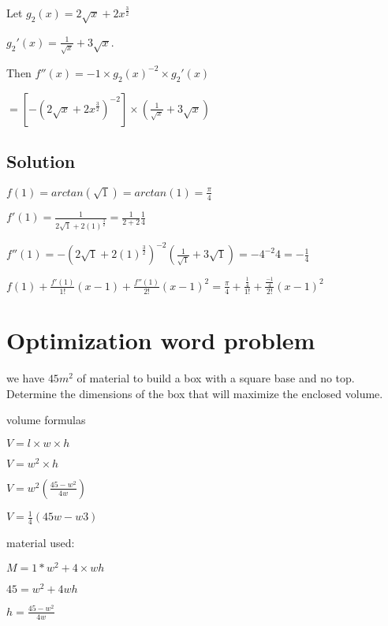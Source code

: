\documentclass[12pt,a4paper]{article}
\begin{document}
\noindent Let  $g_2(x) = 2\sqrt{x} + 2x^{\frac{3}{2}}$

\noindent $g_2'(x) = \frac{1}{\sqrt{x}} + 3\sqrt{x}$.

\noindent Then $f''(x) = -1 \times g_2(x)^{-2} \times g_2'(x)$

$=[-(2\sqrt{x} + 2x^{\frac{3}{2}})^{-2}] \times (\frac{1}{\sqrt{x}} + 3\sqrt{x})$

\subsection*{Solution}

\noindent $f(1) = arctan(\sqrt{1}) = arctan (1) = \frac{\pi}{4}$

\noindent $f'(1) = \frac{1}{2\sqrt{1} + 2(1)^{\frac{3}{2}}} = \frac{1}{2+2} \frac{1}{4}$

\noindent $f''(1) = -(2\sqrt{1} + 2(1)^{\frac{3}{2}})^{-2}(\frac{1}{\sqrt{1}} + 3\sqrt{1}) = -4^{-2} 4 = -\frac{1}{4}$

\noindent $f(1) + \frac{f'(1)}{1!}(x-1) + \frac{f''(1)}{2!}(x-1)^2 = \frac{\pi}{4} + \frac{\frac{1}{4}}{1!} + \frac{\frac{-1}{4}}{2!}(x-1)^2$

\newpage

\section*{Optimization word problem}

\noindent we have $45 m^2$ of material to build a box with a square base and no top. Determine the dimensions of the box that will maximize the enclosed volume.
\newline

\noindent volume formulas

\noindent $V = l \times w \times h$

\noindent $V = w^2 \times h$
\newline

\noindent $V = w^2 (\frac{45 - w^2}{4w})$

\noindent $V = \frac{1}{4} (45w-w3)$
\newline

\noindent material used:

\noindent $M = 1 * w^2 + 4 \times wh$
\newline

\noindent $45 = w^2 + 4wh$

\noindent $h = \frac{45 - w^2}{4w}$
\newline
\end{document}
